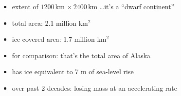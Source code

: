 \documentclass[hide notes,intlimits]{beamer}
\begin{document}
\begin{frame}[plain]
\end{frame}

  {
} 

\begin{frame}[plain]
    \begin{itemize}
    \item extent of $1200\,\text{km}\,\times 2400\,\text{km}$ \dots it's a ``dwarf continent''
    \item total area: 2.1 million km$^2$
    \item ice covered area:  1.7 million km$^2$
    \item \alert{for comparison: that's the total area of Alaska}
    \item has ice equivalent to 7 m of sea-level rise
    \item over past 2 decades: losing mass at an accelerating rate
    \end{itemize}
\end{frame}


{
%
} 
\end{document}
